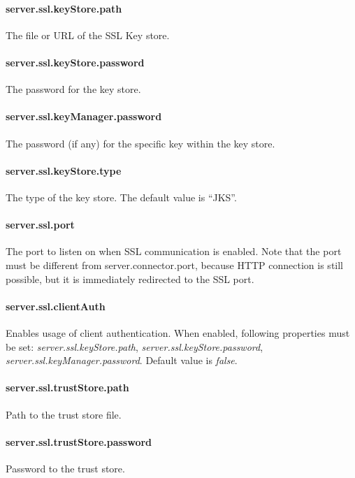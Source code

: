 \paragraph{server.ssl.keyStore.path}
The file or URL of the SSL Key store.

\paragraph{server.ssl.keyStore.password}
The password for the key store.

\paragraph{server.ssl.keyManager.password}
The password (if any) for the specific key within the key store.

\paragraph{server.ssl.keyStore.type}
The type of the key store. The default value is ``JKS''.

\paragraph{server.ssl.port}
The port to listen on when SSL communication is enabled. Note that the port must
be different from server.connector.port, because HTTP connection is still
possible, but it is immediately redirected to the SSL port.

\paragraph{server.ssl.clientAuth}
Enables usage of client authentication. When enabled, following properties must
be set: \emph{server.\-ssl.\-keyStore.\-path}, \emph{server.\-ssl.\-keyStore.\-password},
\emph{server.\-ssl.\-keyManager.\-password}. Default value is \emph{false}.

\paragraph{server.ssl.trustStore.path}
Path to the trust store file.

\paragraph{server.ssl.trustStore.password}
Password to the trust store.


